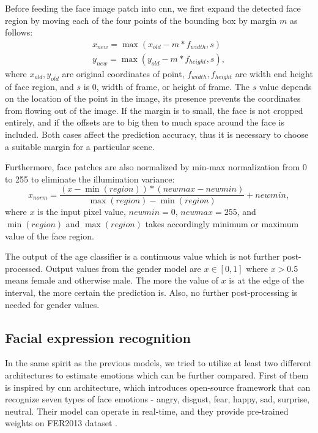             Before feeding the face image patch into \gls{cnn}, we first expand the detected face region by moving each of the four points of the bounding box by margin $m$ as follows:
            \begin{align}
               x_{new} = \max(x_{old} - m * f_{width}, s) \\
               y_{new} = \max(y_{old} - m * f_{height}, s),
            \end{align}
            where $x_{old}, y_{old}$ are original coordinates of point, $f_{width}, f_{height}$ are width end height of face region, and $s$ is $0$, width of frame, or height of frame. The $s$ value depends on the location of the point in the image, its presence prevents the coordinates from flowing out of the image. If the margin is to small, the face is not cropped entirely, and if the offsets are to big then to much space around the face is included. Both cases affect the prediction accuracy, thus it is necessary to choose a suitable margin for a particular scene.
            
            Furthermore, face patches are also normalized by min-max normalization from 0 to 255 to eliminate the illumination variance:
            \begin{equation}
                    x_{norm} = \frac{( x - \min(region) ) * (newmax - newmin)}{\max(region) - \min(region)} + newmin,
            \end{equation}
            where $x$ is the input pixel value, $newmin=0$, $newmax=255$, and $\min(region)$ and $\max(region)$ takes accordingly minimum or maximum value of the face region. 
            
           The output of the age classifier is a continuous value which is not further post-processed. Output values from the gender model are $x \in [0,1]$ where $x > 0.5$ means female and otherwise male. The more the value of $x$ is at the edge of the interval, the more certain the prediction is. Also, no further post-processing is needed for gender values.

        \subsection{Facial expression recognition}
           In the same spirit as the previous models, we tried to utilize at least two different architectures to estimate emotions which can be further compared. First of them is \cite{arriaga2017real} inspired by \cite{rothe2015dex} \gls{cnn} architecture, which introduces open-source framework that can recognize seven types of face emotions - angry, disgust, fear, happy, sad, surprise, neutral. Their model can operate in real-time, and they provide pre-trained weights on FER2013 dataset \cite{goodfellow2013challenges}. 
            
